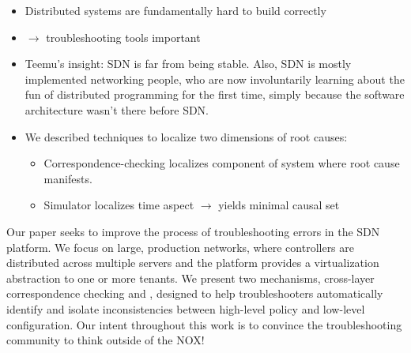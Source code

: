 \begin{itemize}
\item Distributed systems are fundamentally hard to build correctly 
\item $\rightarrow$ troubleshooting tools important
\item Teemu's insight: SDN is far from being stable. Also, SDN is mostly implemented
networking people, who are now involuntarily learning about the fun of
distributed programming for the first time, simply because the software
architecture wasn't there before SDN.
\item We described techniques to localize two dimensions of root causes:
    \begin{itemize}
    \item Correspondence-checking localizes component of system where root cause
    manifests. 
    \item Simulator localizes time aspect $\rightarrow$ yields minimal causal set
    \end{itemize}
\end{itemize}

Our paper seeks to improve the process of troubleshooting errors in the SDN
platform. We focus on large, production networks, 
where controllers are distributed across multiple servers
and the platform provides a virtualization abstraction to one or more tenants.
We present two mechanisms, cross-layer correspondence checking
and \simulator{}, designed to help troubleshooters automatically identify
and isolate inconsistencies between high-level policy and low-level
configuration. Our intent throughout this work is to convince
the troubleshooting community to think outside of the NOX!
